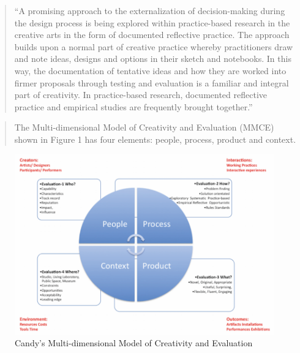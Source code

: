 \begin{quote}
  ``A promising approach to the externalization of decision-making during the design process is being explored within practice-based research in the creative arts in the form of documented reflective practice. The approach builds upon a normal part of creative practice whereby practitioners draw and note ideas, designs and options in their sketch and notebooks. In this way, the documentation of tentative ideas and how they are worked into firmer proposals through testing and evaluation is a familiar and integral part of creativity. In practice-based research, documented reflective practice and empirical studies are frequently brought together.'' \citep[p.10]{Candy2012}
\end{quote}

\begin{quote}
  The Multi-dimensional Model of Creativity and Evaluation (MMCE) shown in Figure 1 has four elements: people, process, product and context. \citep[p.11]{Candy2012}
\end{quote}

\begin{figure}[htb] %
  \centering
  \includegraphics[width=\linewidth]{images/candy02.png}
\caption[Multi-dimensional Model of Creativity and Evaluation]{Candy's Multi-dimensional Model of Creativity and Evaluation}
\label{fig:candy02}
\end{figure}

